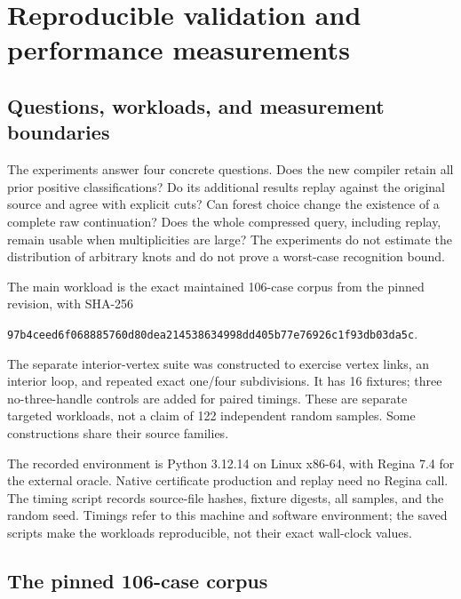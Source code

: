 \section{Reproducible validation and performance measurements}
\label{sec:experiments}

\subsection{Questions, workloads, and measurement boundaries}

The experiments answer four concrete questions. Does the new compiler retain
all prior positive classifications? Do its additional results replay against
the original source and agree with explicit cuts? Can forest choice change
the existence of a complete raw continuation? Does the whole compressed
query, including replay, remain usable when multiplicities are large?
The experiments do not estimate the distribution of arbitrary knots and do
not prove a worst-case recognition bound.

The main workload is the exact maintained 106-case corpus from the pinned
revision, with SHA-256
\begin{center}\small
\texttt{97b4ceed6f068885760d80dea214538634998dd405b77e76926c1f93db03da5c}.
\end{center}
The separate interior-vertex suite was constructed to exercise vertex links,
an interior loop, and repeated exact one/four subdivisions. It has 16
fixtures; three no-three-handle controls are added for paired timings.
These are separate targeted workloads, not a claim of 122 independent
random samples. Some constructions share their source families.

The recorded environment is Python 3.12.14 on Linux x86-64, with Regina
7.4 for the external oracle. Native certificate production and replay need
no Regina call. The timing script records source-file hashes, fixture
digests, all samples, and the random seed. Timings refer to this machine
and software environment; the saved scripts make the workloads reproducible,
not their exact wall-clock values.

\subsection{The pinned 106-case corpus}

